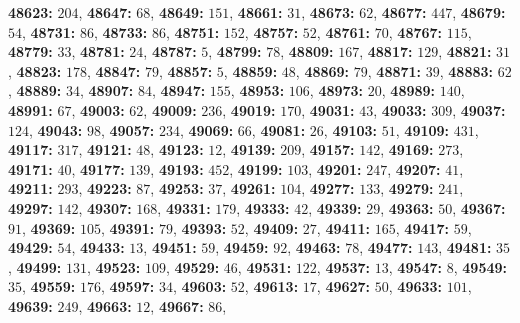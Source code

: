 \textsf{\bfseries 48623:} $204$, \textsf{\bfseries 48647:} $68$, \textsf{\bfseries 48649:} $151$, \textsf{\bfseries 48661:} $31$, \textsf{\bfseries 48673:} $62$, \textsf{\bfseries 48677:} $447$, \textsf{\bfseries 48679:} $54$, \textsf{\bfseries 48731:} $86$, \textsf{\bfseries 48733:} $86$, \textsf{\bfseries 48751:} $152$, \textsf{\bfseries 48757:} $52$, \textsf{\bfseries 48761:} $70$, \textsf{\bfseries 48767:} $115$, \textsf{\bfseries 48779:} $33$, \textsf{\bfseries 48781:} $24$, \textsf{\bfseries 48787:} $5$, \textsf{\bfseries 48799:} $78$, \textsf{\bfseries 48809:} $167$, \textsf{\bfseries 48817:} $129$, \textsf{\bfseries 48821:} $31$, \textsf{\bfseries 48823:} $178$, \textsf{\bfseries 48847:} $79$, \textsf{\bfseries 48857:} $5$, \textsf{\bfseries 48859:} $48$, \textsf{\bfseries 48869:} $79$, \textsf{\bfseries 48871:} $39$, \textsf{\bfseries 48883:} $62$, \textsf{\bfseries 48889:} $34$, \textsf{\bfseries 48907:} $84$, \textsf{\bfseries 48947:} $155$, \textsf{\bfseries 48953:} $106$, \textsf{\bfseries 48973:} $20$, \textsf{\bfseries 48989:} $140$, \textsf{\bfseries 48991:} $67$, \textsf{\bfseries 49003:} $62$, \textsf{\bfseries 49009:} $236$, \textsf{\bfseries 49019:} $170$, \textsf{\bfseries 49031:} $43$, \textsf{\bfseries 49033:} $309$, \textsf{\bfseries 49037:} $124$, \textsf{\bfseries 49043:} $98$, \textsf{\bfseries 49057:} $234$, \textsf{\bfseries 49069:} $66$, \textsf{\bfseries 49081:} $26$, \textsf{\bfseries 49103:} $51$, \textsf{\bfseries 49109:} $431$, \textsf{\bfseries 49117:} $317$, \textsf{\bfseries 49121:} $48$, \textsf{\bfseries 49123:} $12$, \textsf{\bfseries 49139:} $209$, \textsf{\bfseries 49157:} $142$, \textsf{\bfseries 49169:} $273$, \textsf{\bfseries 49171:} $40$, \textsf{\bfseries 49177:} $139$, \textsf{\bfseries 49193:} $452$, \textsf{\bfseries 49199:} $103$, \textsf{\bfseries 49201:} $247$, \textsf{\bfseries 49207:} $41$, \textsf{\bfseries 49211:} $293$, \textsf{\bfseries 49223:} $87$, \textsf{\bfseries 49253:} $37$, \textsf{\bfseries 49261:} $104$, \textsf{\bfseries 49277:} $133$, \textsf{\bfseries 49279:} $241$, \textsf{\bfseries 49297:} $142$, \textsf{\bfseries 49307:} $168$, \textsf{\bfseries 49331:} $179$, \textsf{\bfseries 49333:} $42$, \textsf{\bfseries 49339:} $29$, \textsf{\bfseries 49363:} $50$, \textsf{\bfseries 49367:} $91$, \textsf{\bfseries 49369:} $105$, \textsf{\bfseries 49391:} $79$, \textsf{\bfseries 49393:} $52$, \textsf{\bfseries 49409:} $27$, \textsf{\bfseries 49411:} $165$, \textsf{\bfseries 49417:} $59$, \textsf{\bfseries 49429:} $54$, \textsf{\bfseries 49433:} $13$, \textsf{\bfseries 49451:} $59$, \textsf{\bfseries 49459:} $92$, \textsf{\bfseries 49463:} $78$, \textsf{\bfseries 49477:} $143$, \textsf{\bfseries 49481:} $35$, \textsf{\bfseries 49499:} $131$, \textsf{\bfseries 49523:} $109$, \textsf{\bfseries 49529:} $46$, \textsf{\bfseries 49531:} $122$, \textsf{\bfseries 49537:} $13$, \textsf{\bfseries 49547:} $8$, \textsf{\bfseries 49549:} $35$, \textsf{\bfseries 49559:} $176$, \textsf{\bfseries 49597:} $34$, \textsf{\bfseries 49603:} $52$, \textsf{\bfseries 49613:} $17$, \textsf{\bfseries 49627:} $50$, \textsf{\bfseries 49633:} $101$, \textsf{\bfseries 49639:} $249$, \textsf{\bfseries 49663:} $12$, \textsf{\bfseries 49667:} $86$, 
